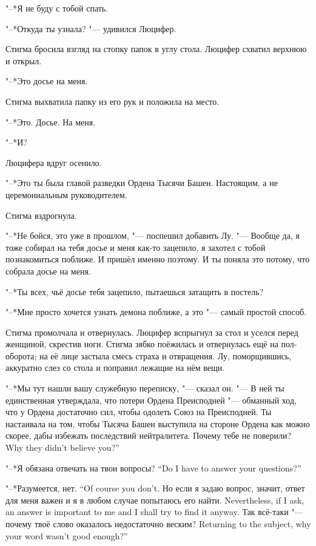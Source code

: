 "--*Я не буду с тобой спать.

"--*Откуда ты узнала? "--- удивился Люцифер.

Стигма бросила взгляд на стопку папок в углу стола.
Люцифер схватил верхнюю и открыл.

"--*Это досье на меня.

Стигма выхватила папку из его рук и положила на место.

"--*Это. Досье. На меня.

"--*И?

Люцифера вдруг осенило.

"--*Это ты была главой разведки Ордена Тысячи Башен.
Настоящим, а не церемониальным руководителем.

Стигма вздрогнула.

"--*Не бойся, это уже в прошлом, "--- поспешил добавить Лу.
"--- Вообще да, я тоже собирал на тебя досье и меня как-то зацепило, я захотел с тобой познакомиться поближе.
И пришёл именно поэтому.
И ты поняла это потому, что собрала досье на меня.

"--*Ты всех, чьё досье тебя зацепило, пытаешься затащить в постель?

"--*Мне просто хочется узнать демона поближе, а это "--- самый простой способ.

Стигма промолчала и отвернулась.
Люцифер вспрыгнул за стол и уселся перед женщиной, скрестив ноги.
Стигма зябко поёжилась и отвернулась ещё на пол-оборота;
на её лице застыла смесь страха и отвращения.
Лу, поморщившись, аккуратно слез со стола и поправил лежащие на нём вещи.

"--*Мы тут нашли вашу служебную переписку, "--- сказал он.
"--- В ней ты единственная утверждала, что потери Ордена Преисподней "--- обманный ход, что у Ордена достаточно сил, чтобы одолеть Союз на Преисподней.
Ты настаивала на том, чтобы Тысяча Башен выступила на стороне Ордена как можно скорее, дабы избежать последствий нейтралитета.
{Почему тебе не поверили?}
{Why they didn't believe you?''}

{"--*Я обязана отвечать на твои вопросы?}
{``Do I have to answer your questions?''}

{"--*Разумеется, нет.}
{``Of course you don't.}
{Но если я задаю вопрос, значит, ответ для меня важен и я в любом случае попытаюсь его найти.}
{Nevertheless, if I ask, an answer is important to me and I shall try to find it anyway.}
{Так всё-таки "--- почему твоё слово оказалось недостаточно веским?}
{Returning to the subject, why your word wasn't good enough?''}

